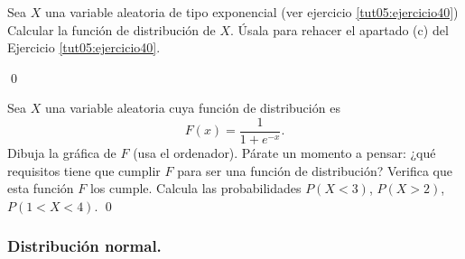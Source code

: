 \documentclass[10pt,a4paper]{article}\usepackage[]{graphicx}\usepackage[]{color}
\begin{document}
\begin{ejercicio}
\label{tut05:ejercicio45}
Sea $X$ una variable aleatoria de tipo exponencial (ver ejercicio \ref{tut05:ejercicio40})
Calcular la función de distribución de $X$. Úsala para rehacer el apartado (c) del Ejercicio \ref{tut05:ejercicio40}.

\qed\end{ejercicio}
\begin{ejercicio}
\label{tut05:ejercicio46}
Sea $X$ una variable aleatoria cuya función de distribución es
		\[F(x)=\dfrac{1}{1+e^{-x}}.\]
		Dibuja la gráfica de $F$ (usa el ordenador). Párate un momento a pensar: ¿qué requisitos tiene 				que cumplir $F$ para ser una función de distribución? Verifica que esta función $F$ los cumple.
		Calcula las probabilidades $P(X<3)$, $P(X>2)$, $P(1<X<4)$.		
\qed\end{ejercicio}


\subsubsection*{Distribución normal.}
\end{document}
